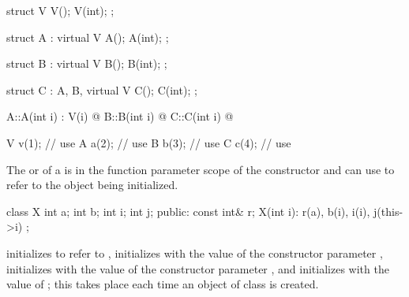 \pnum
\begin{example}
\begin{codeblock}
struct V {
  V();
  V(int);
};

struct A : virtual V {
  A();
  A(int);
};

struct B : virtual V {
  B();
  B(int);
};

struct C : A, B, virtual V {
  C();
  C(int);
};

A::A(int i) : V(i) { @\commentellip@ }
B::B(int i) { @\commentellip@ }
C::C(int i) { @\commentellip@ }

V v(1);             // use 
A a(2);             // use 
B b(3);             // use 
C c(4);             // use 
\end{codeblock}
\end{example}

\pnum
{}%
\begin{note}
The  or 
of a 
is in the function parameter scope of the constructor
and can use  to refer to the object being initialized.
\end{note}
\begin{example}
\begin{codeblock}
class X {
  int a;
  int b;
  int i;
  int j;
public:
  const int& r;
  X(int i): r(a), b(i), i(i), j(this->i) { }
};
\end{codeblock}

initializes
to refer to
,
initializes
with the value of the constructor parameter
,
initializes
with the value of the constructor parameter
,
and initializes
with the value of
;
this takes place each time an object of class
is created.
\end{example}

